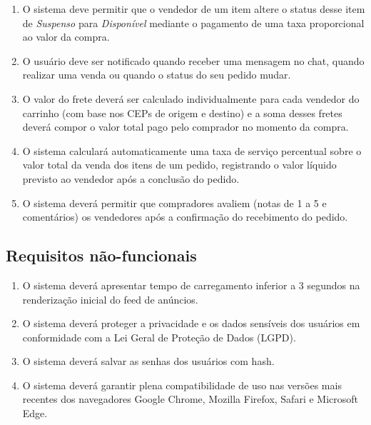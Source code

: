 \documentclass[
	article,			%
	11pt,				%
	oneside,			%
	a4paper,			%
	english,			%
	brazil,				%
	sumario=tradicional
	]{abntex2}
\begin{document}
\begin{enumerate}[label=RF\arabic*:]
    \item O sistema deve permitir que o vendedor de um item altere o status desse item de \textit{Suspenso} para \textit{Disponível} mediante o pagamento de uma taxa proporcional ao valor da compra.

    \item O usuário deve ser notificado quando receber uma mensagem no chat, quando realizar uma venda ou quando o status do seu pedido mudar.

    \item O valor do frete deverá ser calculado individualmente para cada vendedor do carrinho (com base nos CEPs de origem e destino) e a soma desses fretes deverá compor o valor total pago pelo comprador no momento da compra.

     \item O sistema calculará automaticamente uma taxa de serviço percentual sobre o valor total da venda dos itens de um pedido, registrando o valor líquido previsto ao vendedor após a conclusão do pedido.

     \item O sistema deverá permitir que compradores avaliem (notas de 1 a 5 e comentários) os vendedores após a confirmação do recebimento do pedido.

\end{enumerate}

\subsection{Requisitos não-funcionais}
\label{RequisitosNaoFuncionais}

\begin{enumerate}[label=RNF\arabic*:]

    \item O sistema deverá apresentar tempo de carregamento inferior a 3 segundos na renderização inicial do feed de anúncios.

    \item O sistema deverá proteger a privacidade e os dados sensíveis dos usuários em conformidade com a Lei Geral de Proteção de Dados (LGPD).

    \item O sistema deverá salvar as senhas dos usuários com hash.

    \item O sistema deverá garantir plena compatibilidade de uso nas versões mais recentes dos navegadores Google Chrome, Mozilla Firefox, Safari e Microsoft Edge.

\end{enumerate}
\end{document}
